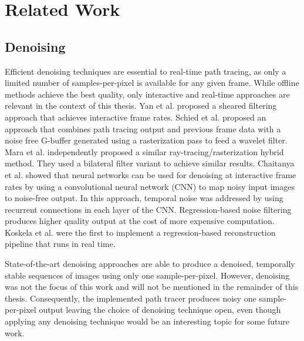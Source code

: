\section{Related Work}
\subsection{Denoising}
\label{denoising}
Efficient denoising techniques are essential to real-time path tracing, as only a limited number of samples-per-pixel is available for any given frame. While offline methods achieve the best quality, only interactive and real-time approaches are relevant in the context of this thesis. Yan et al.\cite{yan14denoising} proposed a sheared filtering approach that achieves interactive frame rates. Schied et al.\cite{schied_spatiotemporal_2017} proposed an approach that combines path tracing output and previous frame data with a noise free G-buffer generated using a rasterization pass to feed a wavelet filter. Mara et al.\cite{mara17towards} independently proposed a similar ray-tracing/rasterization hybrid method. They used a bilateral filter variant to achieve similar results. Chaitanya et al.\cite{chaitanya_interactive_2017} showed that neural networks can be used for denoising at interactive frame rates by using a convolutional neural network (CNN) to map noisy input images to noise-free output. In this approach, temporal noise was addressed by using recurrent connections in each layer of the CNN. Regression-based noise filtering produces higher quality output at the cost of more expensive computation. Koskela et al.\cite{koskela2019bmfr} were the first to implement a regression-based reconstruction pipeline that runs in real time. 

State-of-the-art denoising approaches are able to produce a denoised, temporally stable sequences of images using only one sample-per-pixel. However, denoising was not the focus of this work and will not be mentioned in the remainder of this thesis. Consequently, the implemented path tracer produces noisy one sample-per-pixel output leaving the choice of denoising technique open, even though applying any denoising technique would be an interesting topic for some future work.
